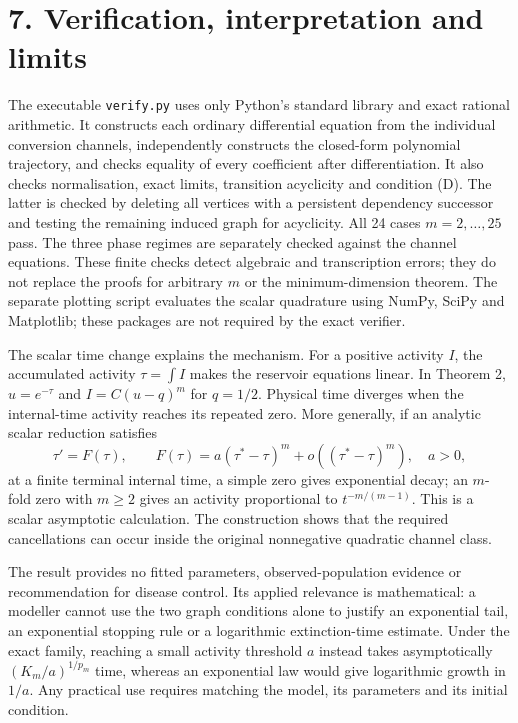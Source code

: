 \documentclass[
  11pt,
  a4paper,
]{scrartcl}
\begin{document}
\section{7. Verification, interpretation and
limits}\label{verification-interpretation-and-limits}

The executable \texttt{verify.py} uses only Python's standard library
and exact rational arithmetic. It constructs each ordinary differential
equation from the individual conversion channels, independently
constructs the closed-form polynomial trajectory, and checks equality of
every coefficient after differentiation. It also checks normalisation,
exact limits, transition acyclicity and condition (D). The latter is
checked by deleting all vertices with a persistent dependency successor
and testing the remaining induced graph for acyclicity. All 24 cases
\(m=2,\ldots,25\) pass. The three phase regimes are separately checked
against the channel equations. These finite checks detect algebraic and
transcription errors; they do not replace the proofs for arbitrary \(m\)
or the minimum-dimension theorem. The separate plotting script evaluates
the scalar quadrature using NumPy, SciPy and Matplotlib; these packages
are not required by the exact verifier.

The scalar time change explains the mechanism. For a positive activity
\(I\), the accumulated activity \(\tau=\int I\) makes the reservoir
equations linear. In Theorem 2, \(u=e^{-\tau}\) and \(I=C(u-q)^m\) for
\(q=1/2\). Physical time diverges when the internal-time activity
reaches its repeated zero. More generally, if an analytic scalar
reduction satisfies \[
\tau'=F(\tau),\qquad
F(\tau)=a(\tau^*-\tau)^m+o((\tau^*-\tau)^m),\quad a>0,
\] at a finite terminal internal time, a simple zero gives exponential
decay; an \(m\)-fold zero with \(m\ge2\) gives an activity proportional
to \(t^{-m/(m-1)}\). This is a scalar asymptotic calculation. The
construction shows that the required cancellations can occur inside the
original nonnegative quadratic channel class.

The result provides no fitted parameters, observed-population evidence
or recommendation for disease control. Its applied relevance is
mathematical: a modeller cannot use the two graph conditions alone to
justify an exponential tail, an exponential stopping rule or a
logarithmic extinction-time estimate. Under the exact family, reaching a
small activity threshold \(a\) instead takes asymptotically
\((K_m/a)^{1/p_m}\) time, whereas an exponential law would give
logarithmic growth in \(1/a\). Any practical use requires matching the
model, its parameters and its initial condition.
\end{document}
